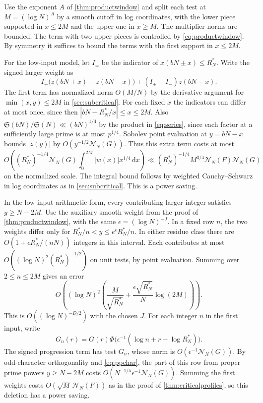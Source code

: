 \documentclass[11pt,a4paper]{article}
\numberwithin{equation}{section}
\newcommand{\SSS}{\mathfrak S}
\newcommand{\ud}{\mathrm d}
\newcommand{\NN}{\mathcal N_N}
\begin{document}
Use the exponent $A$ of \cref{thm:productwindow} and split
each test at $M=(\log N)^A$ by a smooth cutoff in log
coordinates, with the lower piece supported in $x\le2M$
and the upper one in $x\ge M$. The multiplier norms are
bounded. The term with two upper pieces is controlled by
\cref{eq:productwindow}. By symmetry it suffices to bound
the terms with the first support in $x\le2M$.

For the low-input model, let $I_\pm$ be the indicator of
$x(bN\pm x)\le R_N^*$. Write the signed larger weight as
\[
 I_+\bigl(z(bN+x)-z(bN-x)\bigr)+(I_+-I_-)z(bN-x).
\]
The first term has normalized norm $O(M/N)$ by the
derivative argument for $\min(x,y)\le2M$ in
\cref{sec:subcritical}. For each fixed $x$ the indicators
can differ at most once, since then
$|bN-R_N^*/x|\le x\le2M$. Also
$\SSS(bN)/\SSS(N)\ll (bN)^{1/4}$ by the product in
\cref{eq:series}, since each factor at a sufficiently large
prime is at most $p^{1/4}$. Sobolev point evaluation at
$y=bN-x$ bounds $|z(y)|$ by $O(y^{-1/2}\NN(G))$.
Thus this extra term costs at most
\[
 O\!\left((R_N^*)^{-1/4}\NN(G)
             \int_0^{2M}|w(x)|x^{1/4}\,\ud x\right)
     \ll (R_N^*)^{-1/4}M^{3/4}\NN(F)\NN(G)
\]
on the normalized scale. The integral bound follows by
weighted Cauchy--Schwarz in log coordinates as in
\cref{sec:subcritical}. This is a power saving.

In the low-input arithmetic form, every contributing
larger integer satisfies $y\ge N-2M$. Use the auxiliary
smooth weight from the proof of \cref{thm:productwindow},
with the same $\epsilon=(\log N)^{-J}$. In a fixed row $n$,
the two weights differ only for
$R_N^*/n<y\le e^\epsilon R_N^*/n$. In either residue class
there are $O(1+\epsilon R_N^*/(nN))$ integers in this
interval. Each contributes at most
$O((\log N)^2(R_N^*)^{-1/2})$ on unit tests, by point
evaluation. Summing over $2\le n\le2M$ gives an error
\[
 O\!\left((\log N)^2\left(
          \frac{M}{\sqrt{R_N^*}}
           +\frac{\epsilon\sqrt{R_N^*}}N\log(2M)\right)\right).
\]
This is $O((\log N)^{-D/2})$ with the chosen $J$.
For each integer $n$ in the first input, write
\[
 G_n(r)=G(r)\Phi\bigl(\epsilon^{-1}(\log n+r-\log R_N^*)\bigr).
\]
The signed progression term has test $G_n$, whose norm is
$O(\epsilon^{-1}\NN(G))$. By odd-character orthogonality and
\cref{eq:ppchar}, the part of this row from proper prime
powers $y\ge N-2M$ costs $O(N^{-1/5}\epsilon^{-1}\NN(G))$.
Summing the first weights costs $O(\sqrt M\,\NN(F))$ as in
the proof of \cref{thm:criticalprofiles}, so this deletion
has a power saving.
\end{document}
